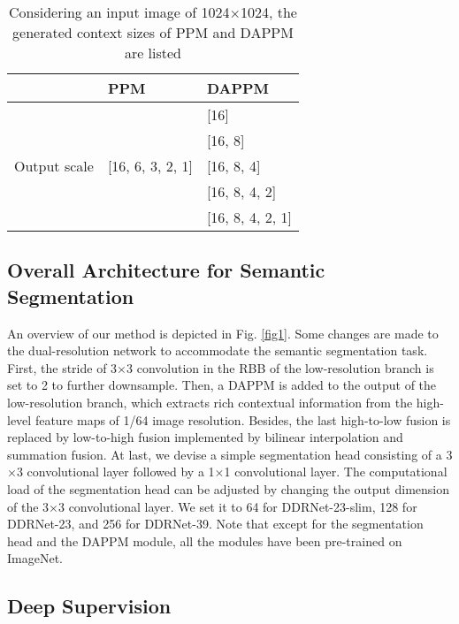 \documentclass[journal]{IEEEtran}
\begin{document}
\begin{table}[]
\caption{Considering an input image of 1024$\times$1024, the generated context sizes of PPM and DAPPM are listed}
\label{tab:6}
\begin{tabular}{p{50pt}p{82pt}<{\centering}p{82pt}<{\centering}}
\toprule
                              & PPM                               & DAPPM  \\ \midrule
\multirow{5}{*}{Output scale} & \multirow{5}{*}{[16, 6, 3, 2, 1]} & [16] \\
                              &                                   & [16, 8] \\
                              &                                   & [16, 8, 4] \\
                              &                                   & [16, 8, 4, 2] \\
                              &                                   & [16, 8, 4, 2, 1] \\ \bottomrule
\end{tabular}
\end{table}

\subsection{Overall Architecture for Semantic Segmentation}

An overview of our method is depicted in Fig. \ref{fig1}. Some changes are made to the dual-resolution network to accommodate the semantic segmentation task. First, the stride of 3$\times$3 convolution in the RBB of the low-resolution branch is set to 2 to further downsample. Then, a DAPPM is added to the output of the low-resolution branch, which extracts rich contextual information from the high-level feature maps of 1/64 image resolution. Besides, the last high-to-low fusion is replaced by low-to-high fusion implemented by bilinear interpolation and summation fusion. At last, we devise a simple segmentation head consisting of a 3$\times$3 convolutional layer followed by a 1$\times$1 convolutional layer. The computational load of the segmentation head can be adjusted by changing the output dimension of the 3$\times$3 convolutional layer. We set it to 64 for DDRNet-23-slim, 128 for DDRNet-23, and 256 for DDRNet-39. Note that except for the segmentation head and the DAPPM module, all the modules have been pre-trained on ImageNet.


\subsection{Deep Supervision}
\end{document}
